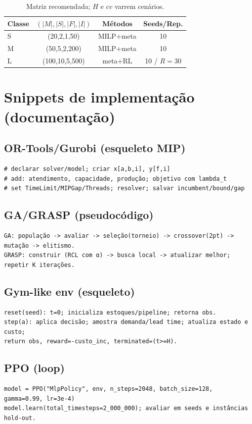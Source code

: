 \begin{table}[htbp]\centering\small
\begin{tabular}{lccc}
\hline
Classe & \((|M|,|S|,|F|,|I|)\) & Métodos & Seeds/Rep. \\
\hline
S & (20,2,1,50) & MILP+meta & 10 \\
M & (50,5,2,200) & MILP+meta & 10 \\
L & (100,10,5,500) & meta+RL & 10 / \(R{=}30\) \\
\hline
\end{tabular}
\caption{Matriz recomendada; \(H\) e \(cv\) varrem cenários.}\label{tab:met_matrix}
\end{table}

\section*{Snippets de implementação (documentação)}
\subsection*{OR-Tools/Gurobi (esqueleto MIP)}
\begin{verbatim}
# declarar solver/model; criar x[a,b,i], y[f,i]
# add: atendimento, capacidade, produção; objetivo com lambda_t
# set TimeLimit/MIPGap/Threads; resolver; salvar incumbent/bound/gap
\end{verbatim}

\subsection*{GA/GRASP (pseudocódigo)}
\begin{verbatim}
GA: população -> avaliar -> seleção(torneio) -> crossover(2pt) -> mutação -> elitismo.
GRASP: construir (RCL com α) -> busca local -> atualizar melhor; repetir K iterações.
\end{verbatim}

\subsection*{Gym-like env (esqueleto)}
\begin{verbatim}
reset(seed): t=0; inicializa estoques/pipeline; retorna obs.
step(a): aplica decisão; amostra demanda/lead time; atualiza estado e custo;
return obs, reward=-custo_inc, terminated=(t>=H).
\end{verbatim}

\subsection*{PPO (loop)}
\begin{verbatim}
model = PPO("MlpPolicy", env, n_steps=2048, batch_size=128, gamma=0.99, lr=3e-4)
model.learn(total_timesteps=2_000_000); avaliar em seeds e instâncias hold-out.
\end{verbatim}

